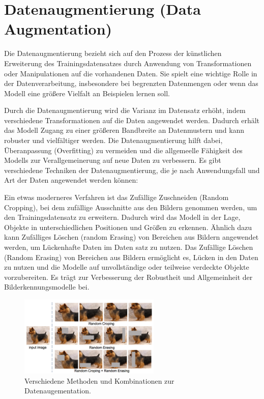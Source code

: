 \section{Datenaugmentierung (Data Augmentation)}

    Die Datenaugmentierung bezieht sich auf den Prozess der künstlichen Erweiterung des Trainingsdatensatzes durch Anwendung von Transformationen oder Manipulationen auf die vorhandenen Daten.
    Sie spielt eine wichtige Rolle in der Datenverarbeitung, insbesondere bei begrenzten Datenmengen oder wenn das Modell eine größere Vielfalt an Beispielen lernen soll.    
    
    Durch die Datenaugmentierung wird die Varianz im Datensatz erhöht, indem verschiedene Transformationen auf die Daten angewendet werden. Dadurch erhält das Modell Zugang zu einer größeren Bandbreite an Datenmustern und kann robuster und vielfältiger werden. 
    Die Datenaugmentierung hilft dabei, Überanpassung (Overfitting) zu vermeiden und die allgemeelle Fähigkeit des Modells zur Verallgemeinerung auf neue Daten zu verbessern.    
    Es gibt verschiedene Techniken der Datenaugmentierung, die je nach Anwendungsfall und Art der Daten angewendet werden können:
    
    Ein etwas moderneres Verfahren ist das Zufällige Zuschneiden (Random Cropping), bei dem zufällige Ausschnitte aus den Bildern genommen werden, um den Trainingsdatensatz zu erweitern. 
    Dadurch wird das Modell in der Lage, Objekte in unterschiedlichen Positionen und Größen zu erkennen.
    Ähnlich dazu kann Zufälliges Löschen (random Erasing) von Bereichen aus Bildern angewendet werden, um Lückenhafte Daten im Daten satz zu nutzen.
    Das Zufällige Löschen (Random Erasing) von Bereichen aus Bildern ermöglicht es, Lücken in den Daten zu nutzen und die Modelle auf unvollständige oder teilweise verdeckte Objekte vorzubereiten.
    Es trägt zur Verbesserung der Robustheit und Allgemeinheit der Bilderkennungsmodelle bei.

    \begin{figure}[!h]
        \centering
        \includegraphics[width=0.6\textwidth]{img/data_augmentation.png}
        \caption{Verschiedene Methoden und Kombinationen zur Datenaugementation.}
        \label{fig:data_augmentation}
    \end{figure}
    
